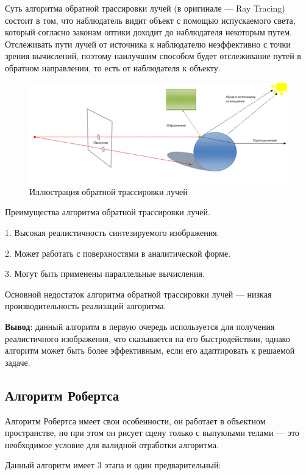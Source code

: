 Суть алгоритма обратной трассировки лучей (в оригинале --- Ray Tracing) состоит в том, что наблюдатель видит объект с помощью испускаемого света, который согласно законам оптики доходит до наблюдателя некоторым путем. Отслеживать пути лучей от источника к наблюдателю неэффективно с точки зрения вычислений, поэтому наилучшим способом будет отслеживание путей в обратном направлении, то есть от наблюдателя к объекту.

\begin{figure}[h]
	\centering
	\includegraphics[width=0.9\linewidth]{images/screenshot003}
	\caption{Иллюстрация обратной трассировки лучей}
	
	\label{fig:screenshot003}
\end{figure}
	
Преимущества алгоритма обратной трассировки лучей.

1.  Высокая реалистичность синтезируемого изображения.

2.	Может работать с поверхностями в аналитической форме.

3.	Могут быть применены параллельные вычисления.

Основной недостаток алгоритма обратной трассировки лучей --- низкая производительность реализаций алгоритма.
	
\textbf{Вывод}: данный алгоритм в первую очередь используется для получения реалистичного изображения, что сказывается на его быстродействии, однако алгоритм может быть более эффективным, если его адаптировать к решаемой задаче.

\subsection{Алгоритм Робертса}

Алгоритм Робертса имеет свои особенности, он работает в объектном пространстве, но при этом он рисует сцену только с выпуклыми телами --– это необходимое условие для валидной отработки алгоритма.

Данный алгоритм имеет 3 этапа и один предварительный:

